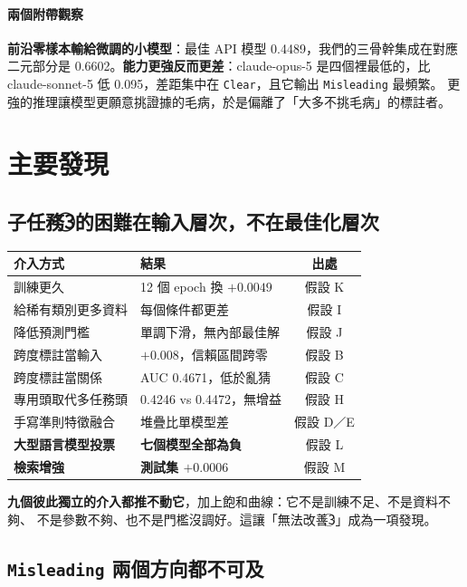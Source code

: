 \documentclass[11pt,a4paper]{ctexart}
\newcommand{\fn}[1]{\texttt{#1}}
\begin{document}
\paragraph{兩個附帶觀察}
\textbf{前沿零樣本輸給微調的小模型}：最佳 API 模型 0.4489，我們的三骨幹集成在對應
二元部分是 0.6602。\textbf{能力更強反而更差}：claude-opus-5 是四個裡最低的，比
claude-sonnet-5 低 0.095，差距集中在 \fn{Clear}，且它輸出 \fn{Misleading} 最頻繁。
更強的推理讓模型更願意挑證據的毛病，於是偏離了「大多不挑毛病」的標註者。

\section{主要發現}

\subsection{子任務\textcircled{3}的困難在輸入層次，不在最佳化層次}

\begin{table}[h]
\centering\small
\begin{tabular}{@{}llc@{}}
\toprule
介入方式 & 結果 & 出處 \\
\midrule
訓練更久 & 12 個 epoch 換 $+0.0049$ & 假設 K \\
給稀有類別更多資料 & 每個條件都更差 & 假設 I \\
降低預測門檻 & 單調下滑，無內部最佳解 & 假設 J \\
跨度標註當輸入 & $+0.008$，信賴區間跨零 & 假設 B \\
跨度標註當關係 & AUC 0.4671，低於亂猜 & 假設 C \\
專用頭取代多任務頭 & 0.4246 vs 0.4472，無增益 & 假設 H \\
手寫準則特徵融合 & 堆疊比單模型差 & 假設 D／E \\
\rowcolor{yellow!15}
\textbf{大型語言模型投票} & \textbf{七個模型全部為負} & 假設 L \\
\rowcolor{yellow!15}
\textbf{檢索增強} & \textbf{測試集 $+0.0006$} & 假設 M \\
\bottomrule
\end{tabular}
\end{table}

\textbf{九個彼此獨立的介入都推不動它}，加上飽和曲線：它不是訓練不足、不是資料不夠、
不是參數不夠、也不是門檻沒調好。這讓「無法改善\textcircled{3}」成為一項發現。

\subsection{\fn{Misleading} 兩個方向都不可及}
\end{document}
